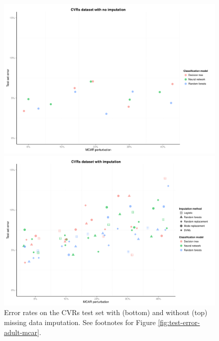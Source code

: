 \documentclass[10pt]{book}
\theoremstyle{definition}
\begin{document}
\begin{figure}[h!]
\includegraphics [scale=0.45]{figure/test-errors-votes-no-imp-mcar.pdf}\par
\includegraphics [scale=0.45]{figure/test-errors-votes-imp-mcar.pdf}\par
   \caption{\footnotesize Error rates on the CVRs test set with (bottom) and without (top) missing data imputation. See footnotes for Figure \ref{fig:test-error-adult-mcar}.}
   \label{fig:test-error-votes-mcar}
\end{figure}

%
%
\end{document}
